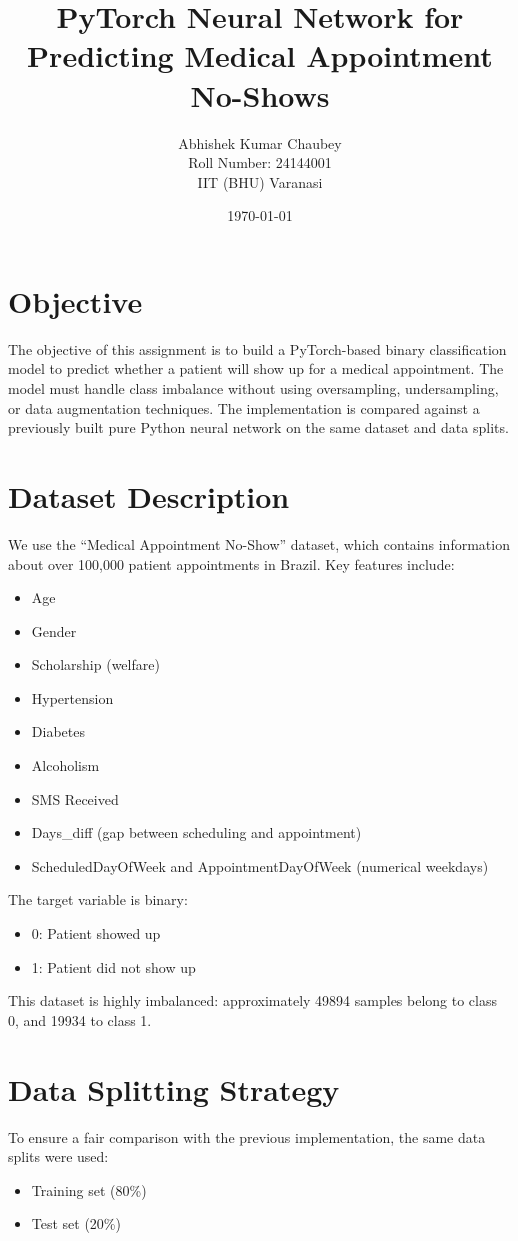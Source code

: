 \documentclass[12pt]{article}
\title{PyTorch Neural Network for Predicting Medical Appointment No-Shows}
\author{Abhishek Kumar Chaubey \\
Roll Number: 24144001 \\
IIT (BHU) Varanasi}
\date{\today}
\begin{document}
\maketitle

\tableofcontents
\newpage

\section*{Objective}
The objective of this assignment is to build a PyTorch-based binary classification model to predict whether a patient will show up for a medical appointment. The model must handle class imbalance without using oversampling, undersampling, or data augmentation techniques. The implementation is compared against a previously built pure Python neural network on the same dataset and data splits.

\section*{Dataset Description}
We use the ``Medical Appointment No-Show'' dataset, which contains information about over 100,000 patient appointments in Brazil. Key features include:

\begin{itemize}
    \item Age
    \item Gender
    \item Scholarship (welfare)
    \item Hypertension
    \item Diabetes
    \item Alcoholism
    \item SMS Received
    \item Days\_diff (gap between scheduling and appointment)
    \item ScheduledDayOfWeek and AppointmentDayOfWeek (numerical weekdays)
\end{itemize}

The target variable is binary:
\begin{itemize}
    \item 0: Patient showed up
    \item 1: Patient did not show up
\end{itemize}

This dataset is highly imbalanced: approximately 49894 samples belong to class 0, and 19934 to class 1.

\section*{Data Splitting Strategy}
To ensure a fair comparison with the previous implementation, the same data splits were used:
\begin{itemize}
    \item Training set (80\%)
    \item Test set (20\%)
\end{itemize}
\end{document}
